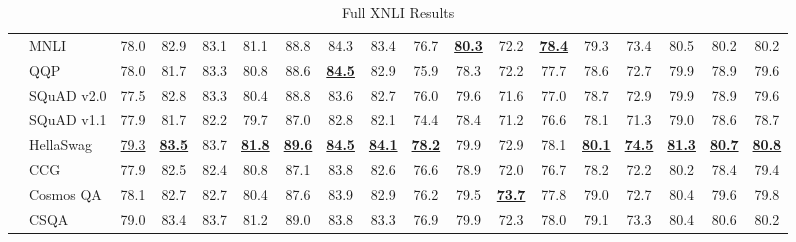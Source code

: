 \documentclass[11pt,a4paper]{article}
\begin{document}
\begin{table*}[t!]
{\begin{tabular}{llcccccccccccccccc}
& MNLI & 78.0 & 82.9 & 83.1 & 81.1 & 88.8 & 84.3 & 83.4 & 76.7 & \underline{\bf 80.3} & 72.2 & \underline{\bf 78.4} & 79.3 & 73.4 & 80.5 & 80.2 & 80.2 \\
& QQP & 78.0 & 81.7 & 83.3 & 80.8 & 88.6 & \underline{\bf 84.5} & 82.9 & 75.9 & 78.3 & 72.2 & 77.7 & 78.6 & 72.7 & 79.9 & 78.9 & 79.6 \\
& SQuAD v2.0 & 77.5 & 82.8 & 83.3 & 80.4 & 88.8 & 83.6 & 82.7 & 76.0 & 79.6 & 71.6 & 77.0 & 78.7 & 72.9 & 79.9 & 78.9 & 79.6 \\
& SQuAD v1.1 & 77.9 & 81.7 & 82.2 & 79.7 & 87.0 & 82.8 & 82.1 & 74.4 & 78.4 & 71.2 & 76.6 & 78.1 & 71.3 & 79.0 & 78.6 & 78.7 \\
& HellaSwag & \underline{79.3} & \underline{\bf 83.5} & 83.7 & \underline{\bf 81.8} & \underline{\bf 89.6} & \underline{\bf 84.5} & \underline{\bf 84.1} & \underline{\bf 78.2} & 79.9 & 72.9 & 78.1 & \underline{\bf 80.1} & \underline{\bf 74.5} & \underline{\bf 81.3} & \underline{\bf 80.7} & \underline{\bf 80.8} \\
& CCG & 77.9 & 82.5 & 82.4 & 80.8 & 87.1 & 83.8 & 82.6 & 76.6 & 78.9 & 72.0 & 76.7 & 78.2 & 72.2 & 80.2 & 78.4 & 79.4 \\
& Cosmos QA & 78.1 & 82.7 & 82.7 & 80.4 & 87.6 & 83.9 & 82.9 & 76.2 & 79.5 & \underline{\bf 73.7} & 77.8 & 79.0 & 72.7 & 80.4 & 79.6 & 79.8 \\
& CSQA & 79.0 & 83.4 & 83.7 & 81.2 & 89.0 & 83.8 & 83.3 & 76.9 & 79.9 & 72.3 & 78.0 & 79.1 & 73.3 & 80.4 & 80.6 & 80.2 \\
\bottomrule
\end{tabular}
}
\caption{Full XNLI Results}
\label{tab:full_xnli}
\end{table*}
\end{document}
